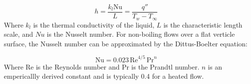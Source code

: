\begin{equation}
h = \frac{k_l \mathrm{Nu}}{L} = \frac{q''}{T_w-T_{\infty}}
\label{eq:htc}
\end{equation}
Where $k_l$ is the thermal conductivity of the liquid, $L$ is the characteristic length scale, and $Nu$ is the Nusselt number.  For non-boiling flows over a flat verticle surface, the Nusselt number can be approximated by the
Dittus-Boelter equation:

\begin{equation}
\mathrm{Nu} = 0.023\, \mathrm{Re}^{4/5}\, \mathrm{Pr}^{n}
\label{eq:db}
\end{equation} 
Where $\mathrm{Re}$ is the Reynolds number and $\mathrm{Pr}$ is the Prandtl number.  $n$ is an empericallly derived constant and is typically 0.4 for a heated flow.
